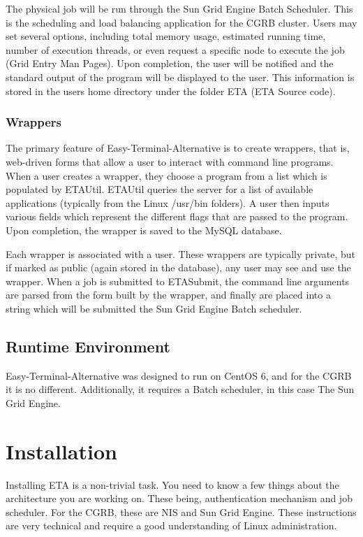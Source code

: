 \documentclass[a4paper,12pt]{article}
\begin{document}
 The physical job will be run through the Sun Grid Engine Batch Scheduler. This is the scheduling and load balancing application for the CGRB cluster. Users may set several options, including total memory usage, estimated running time, number of execution threads, or even request a specific node to execute the job (Grid Entry Man Pages). Upon completion, the user will be notified and the standard output of the program will be displayed to the user. This information is stored in the users home directory under the folder ETA (ETA Source code). 

\subsubsection{Wrappers}
 The primary feature of Easy-Terminal-Alternative is to create wrappers, that is, web-driven forms that allow a user to interact with command line programs. When a user creates a wrapper, they choose a program from a list which is populated by ETAUtil. ETAUtil queries the server for a list of available applications (typically from the Linux /usr/bin folders). A user then inputs various fields which represent the different flags that are passed to the program. Upon completion, the wrapper is saved to the MySQL database.

 Each wrapper is associated with a user. These wrappers are typically private, but if marked as public (again stored in the database), any user may see and use the wrapper. When a job is submitted to ETASubmit, the command line arguments are parsed from the form built by the wrapper, and finally are placed into a string which will be submitted the Sun Grid Engine Batch scheduler.

\subsection{Runtime Environment}
Easy-Terminal-Alternative was designed to run on CentOS 6, and for the CGRB it is no different. Additionally, it requires a Batch scheduler, in this case The Sun Grid Engine. 

\section{Installation}

 Installing ETA is a non-trivial task. You need to know a few things about the architecture you are working on. These being, authentication mechanism and job scheduler. For the CGRB, these are NIS and Sun Grid Engine. These instructions are very technical and require a good understanding of Linux administration.
\end{document}
